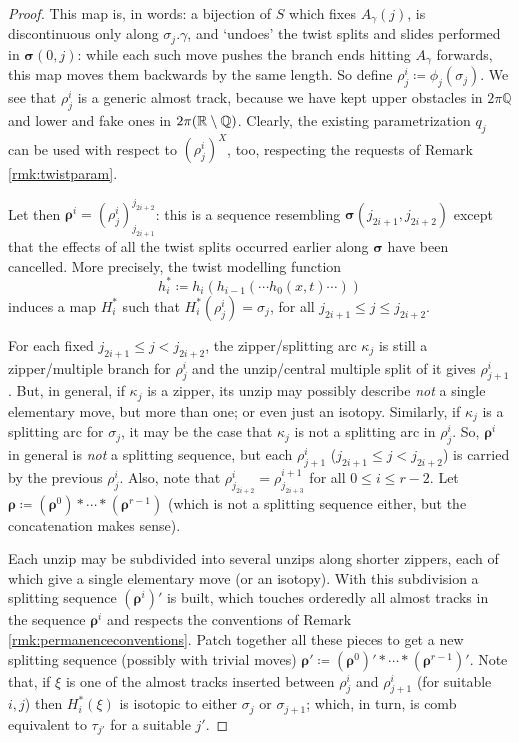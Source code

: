 \begin{proof}
This map is, in words: a bijection of $S$ which fixes $A_\gamma(j)$, is discontinuous only along $\sigma_j.\gamma$, and `undoes' the twist splits and slides performed in $\bm\sigma(0,j)$: while each such move pushes the branch ends hitting $A_\gamma$ forwards, this map moves them backwards by the same length. So define $\rho^i_j\coloneqq \phi_j(\sigma_j)$. We see that $\rho^i_j$ is a generic almost track, because we have kept upper obstacles in $2\pi\mathbb Q$ and lower and fake ones in $2\pi(\mathbb R\setminus\mathbb Q)$. Clearly, the existing parametrization $q_j$ can be used with respect to $(\rho_j^i)^X$, too, respecting the requests of Remark \ref{rmk:twistparam}.

Let then $\bm\rho^i=(\rho^i_j)_{j_{2i+1}}^{j_{2i+2}}$: this is a sequence resembling $\bm\sigma({j_{2i+1}},{j_{2i+2}})$ except that the effects of all the twist splits occurred earlier along $\bm\sigma$ have been cancelled. More precisely, the twist modelling function
\begin{equation}\label{eqn:h_tot}
h^*_i\coloneqq h_i(h_{i-1}(\cdots h_0(x,t)\cdots))
\end{equation}
induces a map $H^*_i$ such that $H^*_i(\rho^i_j)=\sigma_j$, for all $j_{2i+1}\leq j \leq j_{2i+2}$.

For each fixed ${j_{2i+1}}\leq j<{j_{2i+2}}$, the zipper/splitting arc $\kappa_j$ is still a zipper/multiple branch for $\rho^i_j$ and the unzip/central multiple split of it gives $\rho^i_{j+1}$. But, in general, if $\kappa_j$ is a zipper, its unzip may possibly describe \emph{not} a single elementary move, but more than one; or even just an isotopy. Similarly, if $\kappa_j$ is a splitting arc for $\sigma_j$, it may be the case that $\kappa_j$ is not a splitting arc in $\rho^i_j$. So, $\bm\rho^i$ in general is \emph{not} a splitting sequence, but each $\rho^i_{j+1}$ ($j_{2i+1}\leq j < j_{2i+2}$) is carried by the previous $\rho^i_j$. Also, note that $\rho^i_{j_{2i+2}}=\rho^{i+1}_{j_{2i+3}}$ for all $0\leq i\leq r-2$. Let $\bm\rho\coloneqq (\bm\rho^0)*\cdots*(\bm\rho^{r-1})$ (which is not a splitting sequence either, but the concatenation makes sense).

Each unzip may be subdivided into several unzips along shorter zippers, each of which give a single elementary move (or an isotopy). With this subdivision a splitting sequence $(\bm\rho^i)'$ is built, which touches orderedly all almost tracks in the sequence $\bm\rho^i$ and respects the conventions of Remark \ref{rmk:permanenceconventions}. Patch together all these pieces to get a new splitting sequence (possibly with trivial moves) $\bm\rho'\coloneqq (\bm\rho^0)'*\cdots*(\bm\rho^{r-1})'$. Note that, if $\xi$ is one of the almost tracks inserted between $\rho^i_j$ and $\rho^i_{j+1}$ (for suitable $i,j$) then $H^*_i(\xi)$ is isotopic to either $\sigma_j$ or $\sigma_{j+1}$; which, in turn, is comb equivalent to $\tau_{j'}$ for a suitable $j'$.


\end{proof}
